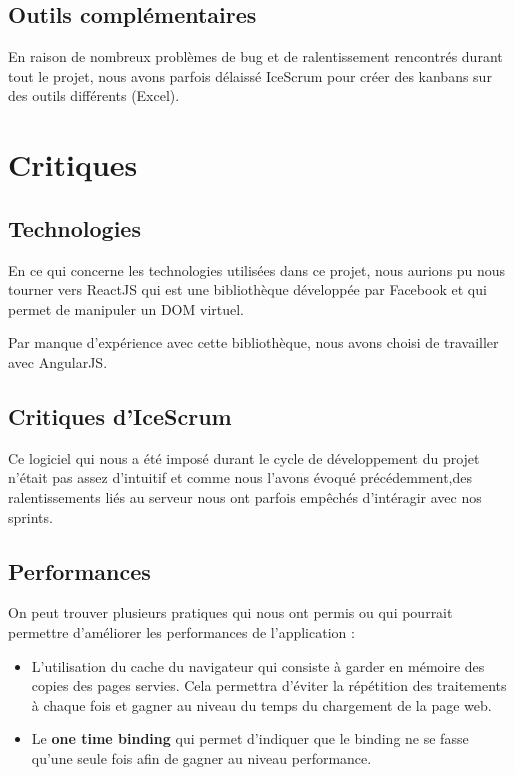 \documentclass [a4paper,11pt]{article}
\begin{document}
\subsection{Outils complémentaires}
En raison de nombreux problèmes de bug et de ralentissement rencontrés durant tout le projet, nous avons parfois délaissé IceScrum pour créer des kanbans sur des outils différents (Excel). 

\newpage

\section{Critiques}

\subsection{Technologies}
En ce qui concerne les technologies utilisées dans ce projet, nous aurions pu nous tourner vers ReactJS qui est une bibliothèque développée par Facebook et qui permet de manipuler un DOM virtuel.
\newline

Par manque d'expérience avec cette bibliothèque, nous avons choisi de travailler avec AngularJS.

\subsection{Critiques d'IceScrum}
Ce logiciel qui nous a été imposé durant le cycle de développement du projet n'était pas assez d'intuitif et comme nous l'avons évoqué précédemment,des ralentissements liés au serveur nous ont parfois empêchés d'intéragir avec nos sprints.

\subsection{Performances}
On peut trouver plusieurs pratiques qui nous ont permis ou qui pourrait permettre d’améliorer les performances de l’application :
\newline

\begin{itemize}
\item L’utilisation du cache du navigateur qui consiste à garder en mémoire des copies des pages servies. Cela permettra d’éviter la répétition des traitements à chaque fois et gagner au niveau du temps du chargement de la page web.\newline
\item Le \textbf{one time binding} qui permet d’indiquer que le binding ne se fasse qu’une seule fois afin de gagner au niveau performance.
\end{itemize}
\end{document}
